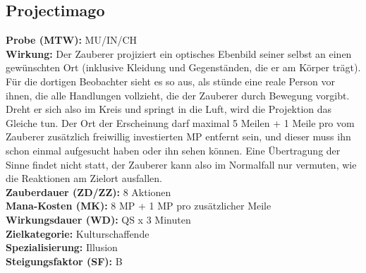 \subsection{Projectimago}
\label{chap:projectimago}
\textbf{Probe (MTW):} MU/IN/CH \\
\textbf{Wirkung:} Der Zauberer projiziert ein optisches Ebenbild seiner selbst an einen gewünschten Ort (inklusive Kleidung und Gegenständen, die er am Körper trägt). Für die dortigen Beobachter sieht es so aus, als stünde eine reale Person vor ihnen, die alle Handlungen vollzieht, die der Zauberer durch Bewegung vorgibt. Dreht er sich also im Kreis und springt in die Luft, wird die Projektion das Gleiche tun. Der Ort der Erscheinung darf maximal 5 Meilen + 1 Meile pro vom Zauberer zusätzlich freiwillig investierten MP entfernt sein, und dieser muss ihn schon einmal aufgesucht haben oder ihn sehen können. Eine Übertragung der Sinne findet nicht statt, der Zauberer kann also im Normalfall nur vermuten, wie die Reaktionen am Zielort ausfallen.\\
\textbf{Zauberdauer (ZD/ZZ):} 8 Aktionen \\
\textbf{Mana-Kosten (MK):} 8 MP + 1 MP pro zusätzlicher Meile \\
\textbf{Wirkungsdauer (WD):} QS x 3 Minuten \\
\textbf{Zielkategorie:} Kulturschaffende \\
\textbf{Spezialisierung:} Illusion \\
\textbf{Steigungsfaktor (SF):} B


